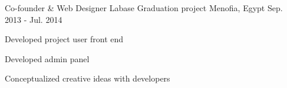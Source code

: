 \begin{cventries}
\cventry
{Co-founder \& Web Designer} %
{Labase Graduation project} %
{Menofia, Egypt} %
{Sep. 2013 - Jul. 2014} %
{
  \begin{cvitems} %
    \item {Developed project user front end}
    \item {Developed admin panel}
    \item {Conceptualized creative ideas with developers}
  \end{cvitems}
}

\end{cventries}
